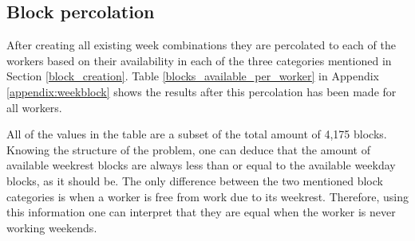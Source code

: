 \subsection{Block percolation}
After creating all existing week combinations they are percolated to each of the workers based on their availability in each of the three categories mentioned in Section \ref{block_creation}. Table \ref{blocks_available_per_worker} in Appendix \ref{appendix:weekblock} shows the results after this percolation has been made for all workers.


All of the values in the table are a subset of the total amount of 4,175 blocks. Knowing the structure of the problem, one can deduce that the amount of available weekrest blocks are always less than or equal to the available weekday blocks, as it should be. The only difference between the two mentioned block categories is when a worker is free from work due to its weekrest. Therefore, using this information one can interpret that they are equal when the worker is never working weekends.
